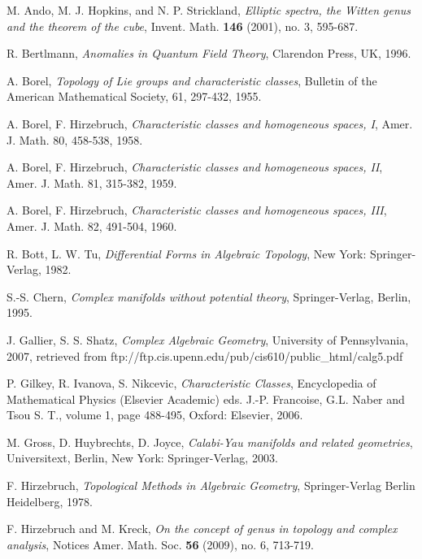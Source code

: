 \documentclass{amsart}
\theoremstyle{plain}
\numberwithin{equation}{section}
\begin{document}
\begin{thebibliography}{99}

M.  Ando, M. J. Hopkins, and N. P. Strickland, {\it Elliptic spectra, the Witten genus and the theorem of the cube},
 Invent. Math. {\bf 146} (2001), no. 3, 595-687. 


 R. Bertlmann,
\emph{Anomalies in Quantum Field Theory}, Clarendon Press, UK, 1996.

 A. Borel,
\textit{Topology of Lie groups and characteristic classes},
Bulletin of the American Mathematical Society, {61}, 297-432, 1955.

 A. Borel, F. Hirzebruch, {\it Characteristic classes and homogeneous spaces, I}, 
Amer. J. Math.  80, 458-538, 1958.

	A. Borel, F. Hirzebruch, {\it Characteristic classes and homogeneous spaces, II}, 
Amer. J. Math. 81, 315-382, 1959.

	A. Borel, F. Hirzebruch, {\it Characteristic classes and homogeneous spaces, III}, 
Amer. J. Math.  82, 491-504, 1960.

 R. Bott, L. W. Tu, \textit{Differential Forms in Algebraic Topology}, New York: Springer-Verlag, 1982.

S.-S. Chern, {\it Complex manifolds without potential theory},
 Springer-Verlag, Berlin, 1995. 

 J. Gallier, S. S. Shatz, \textit{Complex Algebraic Geometry}, University of Pennsylvania, 2007, retrieved from ftp://ftp.cis.upenn.edu/pub/cis610/public\_html/calg5.pdf

 P. Gilkey, R. Ivanova, S. Nikcevic, {\it  Characteristic Classes},  Encyclopedia 
of Mathematical Physics (Elsevier Academic) eds. J.-P. Francoise, G.L. Naber and 
Tsou S. T.,  volume 1,  page 488-495, Oxford: Elsevier, 2006.

  M. Gross, D. Huybrechts, D. Joyce, \textit{Calabi-Yau manifolds and related geometries}, Universitext, Berlin, New York: Springer-Verlag, 2003. 

 F. Hirzebruch,
\emph{Topological Methods in Algebraic Geometry},
Springer-Verlag Berlin Heidelberg, 1978.

F. Hirzebruch and M. Kreck, 
{\it On the concept of genus in topology and complex analysis},
Notices Amer. Math. Soc. {\bf 56} (2009), no. 6, 713-719. 


\end{thebibliography}
\end{document}
